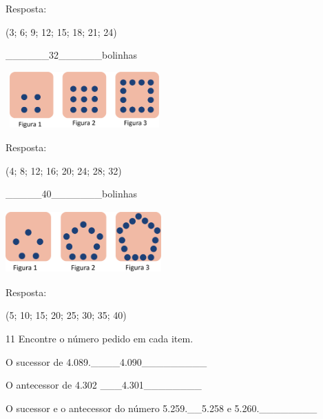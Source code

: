 \begin{escolha}

Resposta:

(3; 6; 9; 12; 15; 18; 21; 24)

\begin{escolha}

\item
  \_\_\_\_\_\_32\_\_\_\_\_\_bolinhas
\end{escolha}

\includegraphics[width=2.38354in,height=0.85007in]{media/image34.png}


Resposta:

(4; 8; 12; 16; 20; 24; 28; 32)

\begin{escolha}

\item
  \_\_\_\_\_40\_\_\_\_\_\_\_bolinhas
\end{escolha}

\includegraphics[width=2.35854in,height=0.94175in]{media/image35.png}


Resposta:

(5; 10; 15; 20; 25; 30; 35; 40)

\num{11} Encontre o número pedido em cada item.

\begin{escolha}

\item
  O sucessor de 4.089.\_\_\_\_4.090\_\_\_\_\_\_\_\_\_
\item
  O antecessor de 4.302 \_\_\_4.301\_\_\_\_\_\_\_\_
\item
  O sucessor e o antecessor do número 5.259.\_\_5.258 e 5.260.\_\_\_\_\_\_\_\_
\end{escolha}


\end{escolha}
